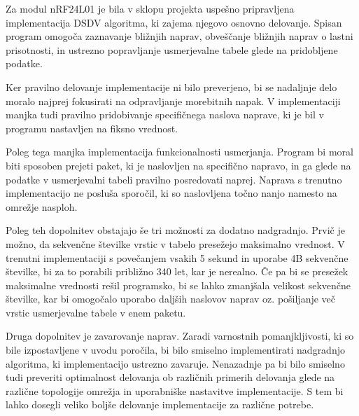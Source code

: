 Za modul nRF24L01 je bila v sklopu projekta uspešno pripravljena implementacija DSDV algoritma, ki zajema njegovo osnovno delovanje. Spisan program omogoča zaznavanje bližnjih naprav, obveščanje bližnjih naprav o lastni prisotnosti, in ustrezno popravljanje usmerjevalne tabele glede na pridobljene podatke.

Ker pravilno delovanje implementacije ni bilo preverjeno, bi se nadaljnje delo moralo najprej fokusirati na odpravljanje morebitnih napak. V implementaciji manjka tudi pravilno pridobivanje specifičnega naslova naprave, ki je bil v programu nastavljen na fiksno vrednost.

Poleg tega manjka implementacija funkcionalnosti usmerjanja. Program bi moral biti sposoben prejeti paket, ki je naslovljen na specifično napravo, in ga glede na podatke v usmerjevalni tabeli pravilno posredovati naprej. Naprava s trenutno implementacijo ne posluša sporočil, ki so naslovljena točno nanjo namesto na omrežje nasploh.

Poleg teh dopolnitev obstajajo še tri možnosti za dodatno nadgradnjo. Prvič je možno, da sekvenčne številke vrstic v tabelo presežejo maksimalno vrednost. V trenutni implementaciji s povečanjem vsakih 5 sekund in uporabe 4B sekvenčne številke, bi za to porabili približno 340 let, kar je nerealno. Če pa bi se presežek maksimalne vrednosti rešil programsko, bi se lahko zmanjšala velikost sekvenčne številke, kar bi omogočalo uporabo daljših naslovov naprav oz. pošiljanje več vrstic usmerjevalne tabele v enem paketu.

Druga dopolnitev je zavarovanje naprav. Zaradi varnostnih pomanjkljivosti, ki so bile izpostavljene v uvodu poročila, bi bilo smiselno implementirati nadgradnjo algoritma, ki implementacijo ustrezno zavaruje. Nenazadnje pa bi bilo smiselno tudi preveriti optimalnost delovanja ob različnih primerih delovanja glede na različne topologije omrežja in uporabniške nastavitve implementacije. S tem bi lahko dosegli veliko boljše delovanje implementacije za različne potrebe.



